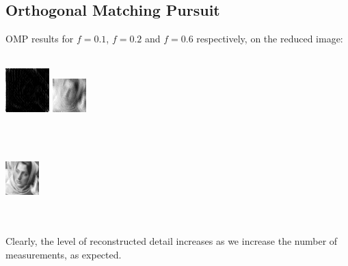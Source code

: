 \documentclass[letterpaper, 10 pt, conference]{article}
\begin{document}
\subsection{Orthogonal Matching Pursuit}
OMP results for $f=0.1$, $f=0.2$ and $f=0.6$ respectively, on the reduced image: \\ \\
\centerline{\includegraphics[scale=2]{out-omp-10p} \includegraphics[scale=2.6]{out-omp-20p}} \\ \\
\centerline{ \includegraphics[scale=2.6]{out-omp-60p}} \\ \\
Clearly, the level of reconstructed detail increases as we increase the number of measurements, as expected. 
\end{document}

